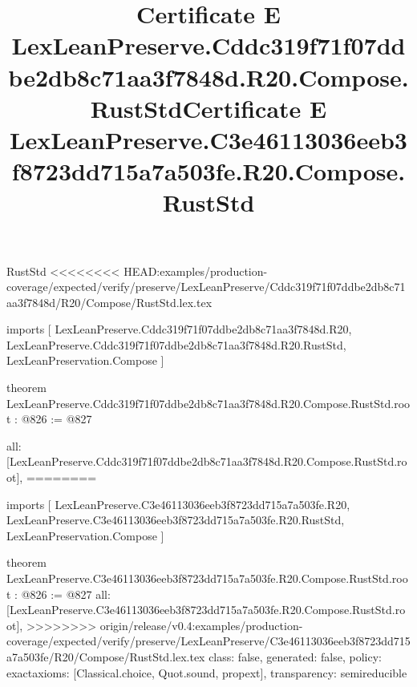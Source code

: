 \begin{lexlean}{RustStd}
<<<<<<<< HEAD:examples/production-coverage/expected/verify/preserve/LexLeanPreserve/Cddc319f71f07ddbe2db8c71aa3f7848d/R20/Compose/RustStd.lex.tex
\title{Certificate E LexLeanPreserve.Cddc319f71f07ddbe2db8c71aa3f7848d.R20.Compose.RustStd}
\begin{coremodule}
imports [
  LexLeanPreserve.Cddc319f71f07ddbe2db8c71aa3f7848d.R20,
  LexLeanPreserve.Cddc319f71f07ddbe2db8c71aa3f7848d.R20.RustStd,
  LexLeanPreservation.Compose
]

theorem LexLeanPreserve.Cddc319f71f07ddbe2db8c71aa3f7848d.R20.Compose.RustStd.root : @826 := @827 {
  all: [LexLeanPreserve.Cddc319f71f07ddbe2db8c71aa3f7848d.R20.Compose.RustStd.root],
========
\title{Certificate E LexLeanPreserve.C3e46113036eeb3f8723dd715a7a503fe.R20.Compose.RustStd}
\begin{coremodule}
imports [
  LexLeanPreserve.C3e46113036eeb3f8723dd715a7a503fe.R20,
  LexLeanPreserve.C3e46113036eeb3f8723dd715a7a503fe.R20.RustStd,
  LexLeanPreservation.Compose
]

theorem LexLeanPreserve.C3e46113036eeb3f8723dd715a7a503fe.R20.Compose.RustStd.root : @826 := @827 {
  all: [LexLeanPreserve.C3e46113036eeb3f8723dd715a7a503fe.R20.Compose.RustStd.root],
>>>>>>>> origin/release/v0.4:examples/production-coverage/expected/verify/preserve/LexLeanPreserve/C3e46113036eeb3f8723dd715a7a503fe/R20/Compose/RustStd.lex.tex
  class: false,
  generated: false,
  policy: exact{axioms: [Classical.choice, Quot.sound, propext]},
  transparency: semireducible
}


\end{coremodule}}
\end{coremodule}
\end{lexlean}
